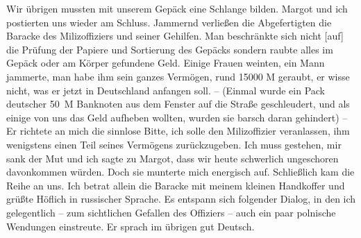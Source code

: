 \documentclass[a5paper,pagesize,10pt,twoside=true]{scrbook}
\renewcommand{\marginpar}[2][]{}
\begin{document}
Wir übrigen mussten mit unserem Gepäck eine Schlange bilden. Margot und ich postierten uns wieder am Schluss. Jammernd verließen \marginpar{119} die Abgefertigten die Baracke des Milizoffiziers und seiner Gehilfen. Man beschränkte sich nicht [auf] die Prüfung der Papiere und Sortierung des Gepäcks sondern raubte alles im Gepäck oder am Körper gefundene Geld. Einige Frauen weinten, ein Mann jammerte, man habe ihm sein ganzes Vermögen, rund \num{15000} M geraubt, er wisse nicht, was er jetzt in Deutschland anfangen soll. -- (Einmal wurde ein Pack deutscher 50~M Banknoten aus dem Fenster auf die Straße geschleudert, und als einige von uns das Geld aufheben wollten, wurden sie barsch daran gehindert) -- Er richtete an mich die sinnlose Bitte, ich solle den Milizoffizier veranlassen, ihm wenigstens einen Teil seines Vermögens zurückzugeben. Ich muss gestehen, mir sank der Mut und ich sagte zu Margot, dass wir heute schwerlich ungeschoren davonkommen würden. Doch sie munterte mich energisch auf. Schließlich kam die Reihe an uns. Ich betrat allein die Baracke mit meinem kleinen Handkoffer und grüßte Höflich in russischer Sprache. Es entspann sich folgender Dialog, in den ich gelegentlich -- zum sichtlichen Gefallen des Offiziers -- auch ein paar polnische Wendungen einstreute. Er sprach im übrigen gut Deutsch.
\end{document}

